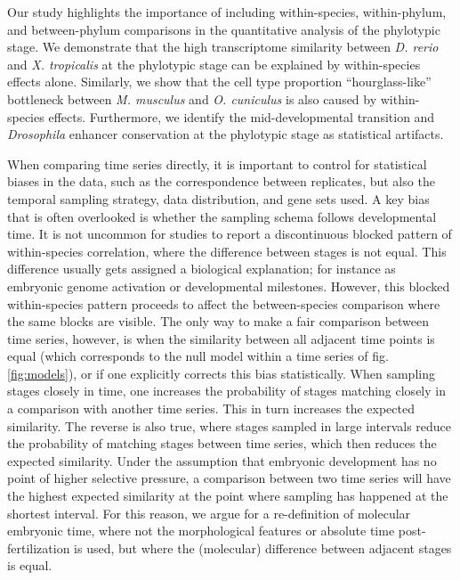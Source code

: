 Our study highlights the importance of including within-species, within-phylum, and between-phylum comparisons in the quantitative analysis of the phylotypic stage. We demonstrate that the high transcriptome similarity between \textit{D. rerio} and \textit{X. tropicalis} at the phylotypic stage\cite{marletaz2018} can be explained by within-species effects alone. Similarly, we show that the cell type proportion ``hourglass-like'' bottleneck between \textit{M. musculus} and \textit{O. cuniculus}\cite{Mayshar2023} is also caused by within-species effects. Furthermore, we identify the mid-developmental transition\cite{Levin2016} and \textit{Drosophila} enhancer conservation at the phylotypic stage\cite{Liu2021} as statistical artifacts. 

When comparing time series directly, it is important to control for statistical biases in the data, such as the correspondence between replicates, but also the temporal sampling strategy, data distribution, and gene sets used. A key bias that is often overlooked is whether the sampling schema follows developmental time\cite{BinindaEmonds2002}. It is not uncommon for studies to report a discontinuous blocked pattern of within-species correlation, where the difference between stages is not equal. This difference usually gets assigned a biological explanation; for instance as embryonic genome activation\cite{Yanai2011} or developmental milestones\cite{Levin2012}. However, this blocked within-species pattern proceeds to affect the between-species comparison where the same blocks are visible. The only way to make a fair comparison between time series, however, is when the similarity between all adjacent time points is equal (which corresponds to the null model within a time series of fig. \ref{fig:models}), or if one explicitly corrects this bias statistically. When sampling stages closely in time, one increases the probability of stages matching closely in a comparison with another time series. This in turn increases the expected similarity. The reverse is also true, where stages sampled in large intervals reduce the probability of matching stages between time series, which then reduces the expected similarity. Under the assumption that embryonic development has no point of higher selective pressure, a comparison between two time series will have the highest expected similarity at the point where sampling has happened at the shortest interval. For this reason, we argue for a re-definition of molecular embryonic time, where not the morphological features or absolute time post-fertilization is used, but where the (molecular) difference between adjacent stages is equal. 

